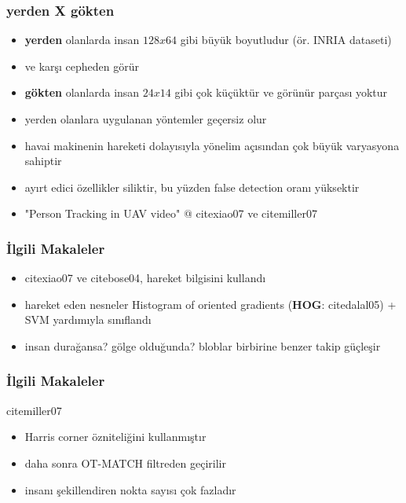 \documentclass{beamer}
\begin{document}
\begin{frame}
	\frametitle{yerden X gökten}

	\begin{itemize}
		\item \textbf{yerden} olanlarda insan $128x64$ gibi büyük boyutludur (ör. INRIA
			  dataseti)
		\item ve karşı cepheden görür
		\item \textbf{gökten} olanlarda insan $24x14$ gibi çok küçüktür ve
			  görünür parçası yoktur
		\item yerden olanlara uygulanan yöntemler geçersiz olur
		\item havai makinenin hareketi dolayısıyla yönelim açısından çok büyük
			  varyasyona sahiptir
		\item ayırt edici özellikler siliktir, bu yüzden false detection oranı
			  yüksektir
		\item "Person Tracking in UAV video" @ cite{xiao07} ve cite{miller07}
	\end{itemize}
\end{frame}

\begin{frame}
	\frametitle {İlgili Makaleler}

	\begin{itemize}
		\item cite{xiao07} ve cite{bose04}, hareket bilgisini kullandı
		\item hareket eden nesneler Histogram of oriented gradients
			  (\textbf{HOG}: cite{dalal05}) + SVM yardımıyla sınıflandı
		\item insan durağansa? gölge olduğunda? bloblar birbirine benzer takip
			  güçleşir
	\end{itemize}
\end{frame}

\begin{frame}
	\frametitle {İlgili Makaleler}

	cite{miller07}

	\begin{itemize}
		\item Harris corner özniteliğini kullanmıştır
		\item daha sonra OT-MATCH filtreden geçirilir
		\item insanı şekillendiren nokta sayısı çok fazladır
	\end{itemize}
\end{frame}
\end{document}
